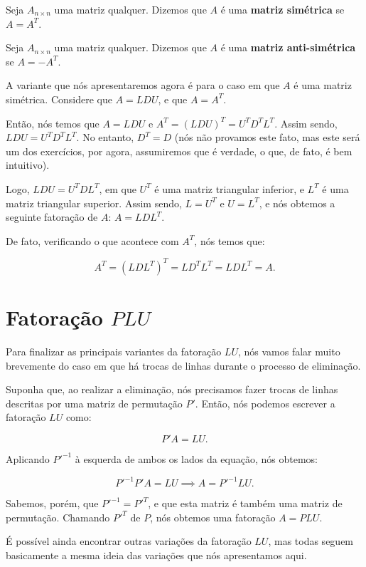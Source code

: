 \begin{Definition}
	Seja $A_{n\times n}$ uma matriz qualquer. Dizemos que $A$ é uma \textbf{matriz simétrica} se $A = A^T$.
\end{Definition}

\begin{Definition}
	Seja $A_{n\times n}$ uma matriz qualquer. Dizemos que $A$ é uma \textbf{matriz anti-simétrica} se $A = -A^T$.
\end{Definition}

A variante que nós apresentaremos agora é para o caso em que $A$ é uma matriz simétrica. Considere que $A = LDU$, e que $A = A^T$.

Então, nós temos que $A = LDU$ e $A^T = (LDU)^T = U^TD^TL^T$. Assim sendo, $LDU = U^TD^TL^T$. No entanto, $D^T = D$ (nós não provamos este fato, mas este será um dos exercícios, por agora, assumiremos que é verdade, o que, de fato, é bem intuitivo).

Logo, $LDU = U^TDL^T$, em que $U^T$ é uma matriz triangular inferior, e $L^T$ é uma matriz triangular superior. Assim sendo, $L = U^T$ e $U = L^T$, e nós obtemos a seguinte fatoração de $A$: $A = LDL^T$.

De fato, verificando o que acontece com $A^T$, nós temos que:

$$
A^T = (LDL^T)^T = LD^TL^T = LDL^T = A.
$$

\section{Fatoração \texorpdfstring{$PLU$}{PLU}}

Para finalizar as principais variantes da fatoração $LU$, nós vamos falar muito brevemente do caso em que há trocas de linhas durante o processo de eliminação.

Suponha que, ao realizar a eliminação, nós precisamos fazer trocas de linhas descritas por uma matriz de permutação $P'$. Então, nós podemos escrever a fatoração $LU$ como:

$$
P'A = LU.
$$

Aplicando $P'^{-1}$ à esquerda de ambos os lados da equação, nós obtemos:

$$
P'^{-1}P'A = LU \implies A = P'^{-1}LU.
$$

Sabemos, porém, que $P'^{-1} = P'^T$, e que esta matriz é também uma matriz de permutação. Chamando $P'^T$ de $P$, nós obtemos uma fatoração $A = PLU$.

É possível ainda encontrar outras variações da fatoração $LU$, mas todas seguem basicamente a mesma ideia das variações que nós apresentamos aqui.

